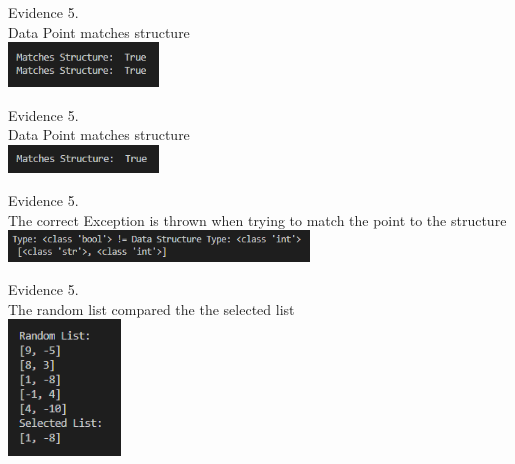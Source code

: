 \begin{flushleft}
\begin{center}
        {\large Evidence 5.\rn } \\ 
        \vspace{0.3cm}
        Data Point matches structure \\
        \includegraphics[width=4cm]{Images/Testing/T4.4.1.PNG} \\
        \vspace{1cm}

        {\large Evidence 5.\rn } \\ 
        \vspace{0.3cm}
        Data Point matches structure \\
        \includegraphics[width=4cm]{Images/Testing/T4.5.1.PNG} \\
        \vspace{1cm}

        {\large Evidence 5.\rn } \\ 
        \vspace{0.3cm}
        The correct Exception is thrown when trying to match the point to the structure \\
        \includegraphics[width=8cm]{Images/Testing/T4.6.1.PNG} \\
        \vspace{1cm}

        {\large Evidence 5.\rn } \\ 
        \vspace{0.3cm}
        The random list compared the the selected list \\
        \includegraphics[width=3cm]{Images/Testing/T4.7.1.PNG} \\
        \vspace{1cm}


\end{center}
\end{flushleft}
